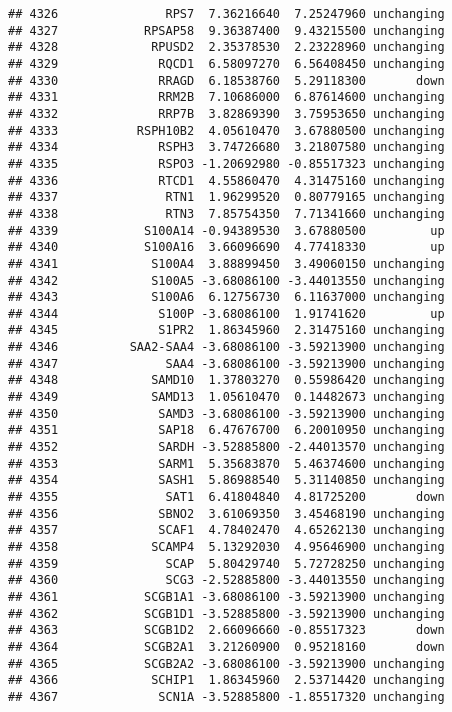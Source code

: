 \documentclass[]{article}
\begin{document}
\begin{verbatim}
## 4326               RPS7  7.36216640  7.25247960 unchanging
## 4327            RPSAP58  9.36387400  9.43215500 unchanging
## 4328             RPUSD2  2.35378530  2.23228960 unchanging
## 4329              RQCD1  6.58097270  6.56408450 unchanging
## 4330              RRAGD  6.18538760  5.29118300       down
## 4331              RRM2B  7.10686000  6.87614600 unchanging
## 4332              RRP7B  3.82869390  3.75953650 unchanging
## 4333           RSPH10B2  4.05610470  3.67880500 unchanging
## 4334              RSPH3  3.74726680  3.21807580 unchanging
## 4335              RSPO3 -1.20692980 -0.85517323 unchanging
## 4336              RTCD1  4.55860470  4.31475160 unchanging
## 4337               RTN1  1.96299520  0.80779165 unchanging
## 4338               RTN3  7.85754350  7.71341660 unchanging
## 4339            S100A14 -0.94389530  3.67880500         up
## 4340            S100A16  3.66096690  4.77418330         up
## 4341             S100A4  3.88899450  3.49060150 unchanging
## 4342             S100A5 -3.68086100 -3.44013550 unchanging
## 4343             S100A6  6.12756730  6.11637000 unchanging
## 4344              S100P -3.68086100  1.91741620         up
## 4345              S1PR2  1.86345960  2.31475160 unchanging
## 4346          SAA2-SAA4 -3.68086100 -3.59213900 unchanging
## 4347               SAA4 -3.68086100 -3.59213900 unchanging
## 4348             SAMD10  1.37803270  0.55986420 unchanging
## 4349             SAMD13  1.05610470  0.14482673 unchanging
## 4350              SAMD3 -3.68086100 -3.59213900 unchanging
## 4351              SAP18  6.47676700  6.20010950 unchanging
## 4352              SARDH -3.52885800 -2.44013570 unchanging
## 4353              SARM1  5.35683870  5.46374600 unchanging
## 4354              SASH1  5.86988540  5.31140850 unchanging
## 4355               SAT1  6.41804840  4.81725200       down
## 4356              SBNO2  3.61069350  3.45468190 unchanging
## 4357              SCAF1  4.78402470  4.65262130 unchanging
## 4358             SCAMP4  5.13292030  4.95646900 unchanging
## 4359               SCAP  5.80429740  5.72728250 unchanging
## 4360               SCG3 -2.52885800 -3.44013550 unchanging
## 4361            SCGB1A1 -3.68086100 -3.59213900 unchanging
## 4362            SCGB1D1 -3.52885800 -3.59213900 unchanging
## 4363            SCGB1D2  2.66096660 -0.85517323       down
## 4364            SCGB2A1  3.21260900  0.95218160       down
## 4365            SCGB2A2 -3.68086100 -3.59213900 unchanging
## 4366             SCHIP1  1.86345960  2.53714420 unchanging
## 4367              SCN1A -3.52885800 -1.85517320 unchanging

\end{verbatim}
\end{document}
